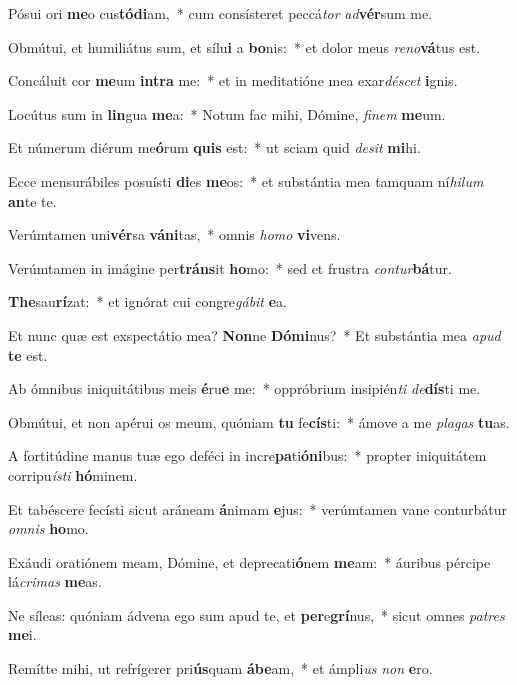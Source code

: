 \item Pósui ori \textbf{me}o cus\textbf{tó}\textbf{di}am,~* cum consísteret peccá\textit{tor} \textit{ad}\textbf{vér}sum me.
\item Obmútui, et humiliátus sum, et sílu\textbf{i} a \textbf{bo}nis:~* et dolor meus \textit{re}\textit{no}\textbf{vá}tus est.
\item Concáluit cor \textbf{me}um \textbf{in}\textbf{tra} me:~* et in meditatióne mea exar\textit{dé}\textit{scet} \textbf{i}gnis.
\item Locútus sum in \textbf{lin}gua \textbf{me}a:~* Notum fac mihi, Dómine, \textit{fi}\textit{nem} \textbf{me}um.
\item Et númerum diérum me\textbf{ó}rum \textbf{quis} est:~* ut sciam quid \textit{de}\textit{sit} \textbf{mi}hi.
\item Ecce mensurábiles posuísti \textbf{di}es \textbf{me}os:~* et substántia mea tamquam ní\textit{hi}\textit{lum} \textbf{an}te te.
\item Verúmtamen uni\textbf{vér}sa \textbf{vá}\textbf{ni}tas,~* omnis \textit{ho}\textit{mo} \textbf{vi}vens.
\item Verúmtamen in imágine per\textbf{tráns}it \textbf{ho}mo:~* sed et frustra \textit{con}\textit{tur}\textbf{bá}tur.
\item \textbf{The}sau\textbf{rí}zat:~* et ignórat cui congre\textit{gá}\textit{bit} \textbf{e}a.
\item Et nunc quæ est exspectátio mea? \textbf{Non}ne \textbf{Dó}\textbf{mi}nus?~* Et substántia mea \textit{a}\textit{pud} \textbf{te} est.
\item Ab ómnibus iniquitátibus meis \textbf{é}ru\textbf{e} me:~* oppróbrium insipién\textit{ti} \textit{de}\textbf{dís}ti me.
\item Obmútui, et non apérui os meum, quóniam \textbf{tu} fe\textbf{cís}ti:~* ámove a me \textit{pla}\textit{gas} \textbf{tu}as.
\item A fortitúdine manus tuæ ego deféci in incre\textbf{pa}ti\textbf{ó}\textbf{ni}bus:~* propter iniquitátem corripu\textit{ís}\textit{ti} \textbf{hó}minem.
\item Et tabéscere fecísti sicut aráneam \textbf{á}nimam \textbf{e}jus:~* verúmtamen vane conturbátur \textit{om}\textit{nis} \textbf{ho}mo.
\item Exáudi oratiónem meam, Dómine, et deprecati\textbf{ó}nem \textbf{me}am:~* áuribus pércipe lá\textit{cri}\textit{mas} \textbf{me}as.
\item Ne síleas: quóniam ádvena ego sum apud te, et \textbf{per}e\textbf{grí}nus,~* sicut omnes \textit{pa}\textit{tres} \textbf{me}i.
\item Remítte mihi, ut refrígerer pri\textbf{ús}quam \textbf{á}\textbf{be}am,~* et ámpli\textit{us} \textit{non} \textbf{e}ro.
